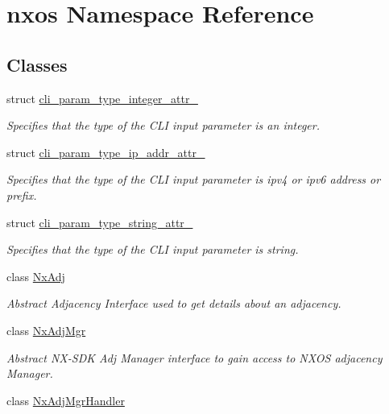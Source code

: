 \hypertarget{namespacenxos}{}\section{nxos Namespace Reference}
\label{namespacenxos}
\subsection*{Classes}
\begin{DoxyCompactItemize}
\item 
struct \mbox{\hyperlink{structnxos_1_1cli__param__type__integer__attr__}{cli\+\_\+param\+\_\+type\+\_\+integer\+\_\+attr\+\_\+}}
\begin{DoxyCompactList}\small\item\em Specifies that the type of the C\+LI input parameter is an integer. \end{DoxyCompactList}\item 
struct \mbox{\hyperlink{structnxos_1_1cli__param__type__ip__addr__attr__}{cli\+\_\+param\+\_\+type\+\_\+ip\+\_\+addr\+\_\+attr\+\_\+}}
\begin{DoxyCompactList}\small\item\em Specifies that the type of the C\+LI input parameter is ipv4 or ipv6 address or prefix. \end{DoxyCompactList}\item 
struct \mbox{\hyperlink{structnxos_1_1cli__param__type__string__attr__}{cli\+\_\+param\+\_\+type\+\_\+string\+\_\+attr\+\_\+}}
\begin{DoxyCompactList}\small\item\em Specifies that the type of the C\+LI input parameter is string. \end{DoxyCompactList}\item 
class \mbox{\hyperlink{classnxos_1_1_nx_adj}{Nx\+Adj}}
\begin{DoxyCompactList}\small\item\em Abstract Adjacency Interface used to get details about an adjacency. \end{DoxyCompactList}\item 
class \mbox{\hyperlink{classnxos_1_1_nx_adj_mgr}{Nx\+Adj\+Mgr}}
\begin{DoxyCompactList}\small\item\em Abstract N\+X-\/\+S\+DK Adj Manager interface to gain access to N\+X\+OS adjacency Manager. \end{DoxyCompactList}\item 
class \mbox{\hyperlink{classnxos_1_1_nx_adj_mgr_handler}{Nx\+Adj\+Mgr\+Handler}}

\end{DoxyCompactItemize}
